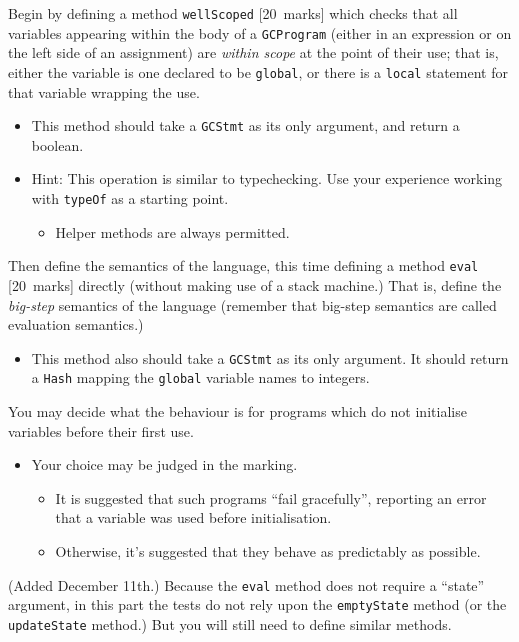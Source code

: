 \documentclass[11pt]{article}
\theoremstyle{definition}
\begin{document}
Begin by defining a method \texttt{wellScoped} [20 marks] which checks that
all variables appearing within the body of a \texttt{GCProgram}
(either in an expression or on the left side of an assignment)
are \emph{within scope} at the point of their use;
that is, either the variable is one declared to be \texttt{global},
or there is a \texttt{local} statement for that variable wrapping the use.
\begin{itemize}
\item This method should take a \texttt{GCStmt} as its only argument,
and return a boolean.
\item Hint: This operation is similar to typechecking.
Use your experience working with \texttt{typeOf} as a starting point.
\begin{itemize}
\item Helper methods are always permitted.
\end{itemize}
\end{itemize}

Then define the semantics of the language,
this time defining a method \texttt{eval} [20 marks] directly
(without making use of a stack machine.)
That is, define the \emph{big-step} semantics of the language
(remember that big-step semantics are called evaluation semantics.)
\begin{itemize}
\item This method also should take a \texttt{GCStmt} as its only argument.
It should return a \texttt{Hash} mapping the \texttt{global} variable names
to integers.
\end{itemize}

You may decide what the behaviour is for programs which
do not initialise variables before their first use.
\begin{itemize}
\item Your choice may be judged in the marking.
\begin{itemize}
\item It is suggested that such programs “fail gracefully”,
reporting an error that a variable was used before initialisation.
\item Otherwise, it's suggested that they behave as predictably as possible.
\end{itemize}
\end{itemize}

(Added December 11th.)
Because the \texttt{eval} method does not require a “state” argument,
in this part the tests do not rely upon the \texttt{emptyState} method
(or the \texttt{updateState} method.) But you will still need
to define similar methods.
\end{document}
